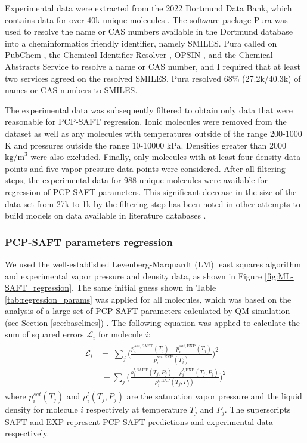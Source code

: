 Experimental data were extracted from the 2022 Dortmund Data Bank, which contains data for over 40k unique molecules \cite{dortmunddatabank}. The software package Pura \cite{purapython} was used to resolve the name or CAS numbers available in the Dortmund database into a cheminformatics friendly identifier, namely SMILES. Pura called on PubChem \cite{Kim2020}, the Chemical Identifier Resolver \cite{cir}, OPSIN \cite{Lowe2011}, and the Chemical Abstracts Service \cite{commonchem} to resolve a name or CAS number, and I required that at least two services agreed on the resolved SMILES. Pura resolved 68\% (27.2k/40.3k) of names or CAS numbers to SMILES. 

The experimental data was subsequently filtered to obtain only data that were reasonable for PCP-SAFT regression. Ionic molecules were removed from the dataset as well as any molecules with temperatures outside of the range 200-1000 K and pressures outside the range 10-10000 kPa. Densities greater than 2000 $\text{kg/m}^{3}$ were also excluded. Finally, only molecules with at least four density data points and five vapor pressure data points were considered. After all filtering steps, the experimental data for 988 unique molecules were available for regression of PCP-SAFT parameters. This significant decrease in the size of the data set from 27k to 1k by the filtering step has been noted in other attempts to build models on data available in literature databases \cite{Fitzner2020, Gao2018}. 

\subsubsection{PCP-SAFT parameters regression}

We used the well-established Levenberg-Marquardt (LM) least squares algorithm and experimental vapor pressure and density data, as shown in Figure \ref{fig:ML-SAFT_regression}. The same initial guess shown in Table \ref{tab:regression_params} was applied for all molecules, which was based on the analysis of a large set of PCP-SAFT parameters calculated by QM simulation (see Section \ref{sec:baselines}) \cite{Kaminski2020}. The following equation was applied to calculate the sum of squared errors $\mathcal{L}_i$ for molecule $i$:
\begin{gather}
\begin{aligned}
    \mathcal{L}_i & = \; \sum_j \biggl(\frac{p_{i}^{sat,\text{SAFT}}(T_j) - p_{i}^{sat,\text{EXP}}(T_j)}{ p_{i}^{sat,\text{EXP}}(T_j)}\biggr)^2 \\
    & \; + \sum_j \biggl(\frac{\rho_{i}^{l,\text{SAFT}}(T_j, P_j) - \rho_{i}^{l,\text{EXP}}(T_j, P_j) }{\rho_{i}^{l,\text{EXP}}(T_j, P_j) }\biggr)^2 
\end{aligned}
\end{gather}
where $p_i^{sat}(T_j)$ and $\rho_{i}^{l}(T_j, P_j)$ are the saturation vapor pressure and the liquid density for molecule $i$ respectively at temperature $T_j$ and $P_j$. The superscripts $\text{SAFT}$ and $\text{EXP}$ represent PCP-SAFT predictions and experimental data respectively. 


